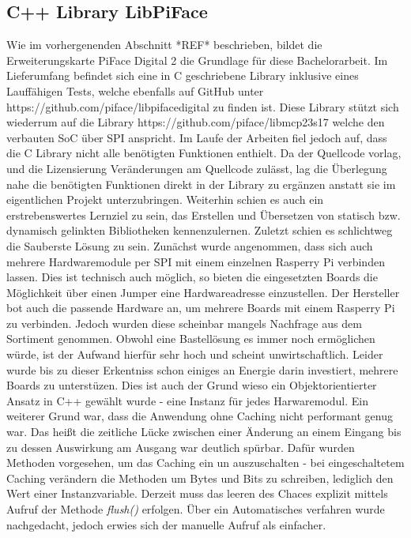 \subsection{C++ Library LibPiFace}
Wie im vorhergenenden Abschnitt *REF* beschrieben, bildet die Erweiterungskarte PiFace Digital 2 \cite{URL:PiFaceDigital2} die Grundlage für diese Bachelorarbeit. Im Lieferumfang befindet sich eine in C geschriebene Library inklusive eines Lauffähigen Tests, welche ebenfalls auf GitHub unter https://github.com/piface/libpifacedigital zu finden ist. Diese Library stützt sich wiederrum auf die Library https://github.com/piface/libmcp23s17 welche den verbauten SoC über SPI anspricht. Im Laufe der Arbeiten fiel jedoch auf, dass die C Library nicht alle benötigten Funktionen enthielt. Da der Quellcode vorlag, und die Lizensierung Veränderungen am Quellcode zulässt, lag die Überlegung nahe die benötigten Funktionen direkt in der Library zu ergänzen anstatt sie im eigentlichen Projekt unterzubringen. Weiterhin schien es auch ein erstrebenswertes Lernziel zu sein, das Erstellen und Übersetzen von statisch bzw. dynamisch gelinkten Bibliotheken kennenzulernen. Zuletzt schien es schlichtweg die Sauberste Lösung zu sein. Zunächst wurde angenommen, dass sich auch mehrere Hardwaremodule per SPI mit einem einzelnen Rasperry Pi verbinden lassen. Dies ist technisch auch möglich, so bieten die eingesetzten Boards die Möglichkeit über einen Jumper eine Hardwareadresse einzustellen. Der Hersteller bot auch die passende Hardware an, um mehrere Boards mit einem Rasperry Pi zu verbinden. Jedoch wurden diese scheinbar mangels Nachfrage aus dem Sortiment genommen. Obwohl eine Bastellösung es immer noch ermöglichen würde, ist der Aufwand hierfür sehr hoch und scheint unwirtschaftlich. Leider wurde bis zu dieser Erkentniss schon einiges an Energie darin investiert, mehrere Boards zu unterstüzen. Dies ist auch der Grund wieso ein Objektorientierter Ansatz in C++ gewählt wurde - eine Instanz für jedes Harwaremodul. Ein weiterer Grund war, dass die Anwendung ohne Caching nicht performant genug war. Das heißt die zeitliche Lücke zwischen einer Änderung an einem Eingang bis zu dessen Auswirkung am Ausgang war deutlich spürbar. Dafür wurden Methoden vorgesehen, um das Caching ein un auszuschalten - bei eingeschaltetem Caching verändern die Methoden um Bytes und Bits zu schreiben, lediglich den Wert einer Instanzvariable. Derzeit muss das leeren des Chaces explizit mittels Aufruf der Methode \textit{flush()} erfolgen. Über ein Automatisches verfahren wurde nachgedacht, jedoch erwies sich der manuelle Aufruf als einfacher. 

